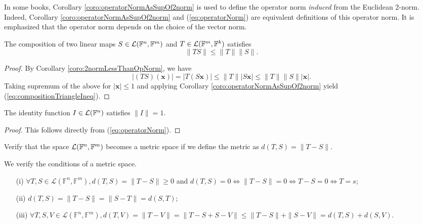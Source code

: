 \begin{rem}
  In some books, Corollary \ref{coro:operatorNormAsSupOf2norm}
  is used to define the operator norm
  \emph{induced} from the Euclidean 2-norm.
  Indeed, Corollary \ref{coro:operatorNormAsSupOf2norm}
  and (\ref{eq:operatorNorm})
  are equivalent definitions of this operator norm.
  It is emphasized that the operator norm
  depends on the choice of the vector norm.
\end{rem}

\begin{coro}
  \label{coro:compositionTriangleIneq}
  The composition of two linear maps
  \mbox{$S\in {\cal L}(\mathbb{F}^n,\mathbb{F}^m)$}
   and \mbox{$T\in {\cal L}(\mathbb{F}^m,\mathbb{F}^k)$}
  satisfies
  \begin{equation}
    \label{eq:compositionTriangleIneq}
    \|TS\| \le \|T\| \|S\|.
  \end{equation}
\end{coro}
\begin{proof}
  By Corollary \ref{coro:2normLessThanOpNorm}, we have
  \begin{displaymath}
    |(TS)(\mathbf{x})| = |T(S\mathbf{x})|
    \le \|T\||S\mathbf{x}| \le \|T\|\|S\||\mathbf{x}|.
  \end{displaymath}
  Taking supremum of the above for $|\mathbf{x}|\le 1$
  and applying Corollary \ref{coro:operatorNormAsSupOf2norm}
  yield (\ref{eq:compositionTriangleIneq}).
\end{proof}

\begin{coro}
  The identity function $I\in {\cal L}(\mathbb{F}^n)$
  satisfies $\|I\|=1$.
\end{coro}
\begin{proof}
  This follows directly from (\ref{eq:operatorNorm}).
\end{proof}

\begin{exc}
  Verify that the space ${\cal L}(\mathbb{F}^n,\mathbb{F}^m)$
  becomes a metric space
  if we define the metric as $d(T,S)=\|T-S\|$.
\end{exc}
\begin{solution}
  We verify the conditions of a metric space.
  \begin{itemize}\itemsep0em
  \item[(i)] $\forall T, S \in \mathcal{L}(\mathbb{F}^n,
    \mathbb{F}^m),
    d(T, S) = \|T - S\| \geq 0 $
    and $d(T, S) = 0 \iff \|T - S\| = 0 \iff T - S = 0 \iff T = s$;
  \item[(ii)] $d(T, S) = \|T - S\| = \|S - T\| = d(S, T)$;
  \item[(iii)] $\forall T, S ,V \in \mathcal{L}(\mathbb{F}^n,
    \mathbb{F}^m),
    d(T, V) = \|T - V\| = \|T - S + S - V\| \leq \|T - S\| + \|S - V\|
    = d(T, S) + d(S, V)$.
  \end{itemize}
\end{solution}

